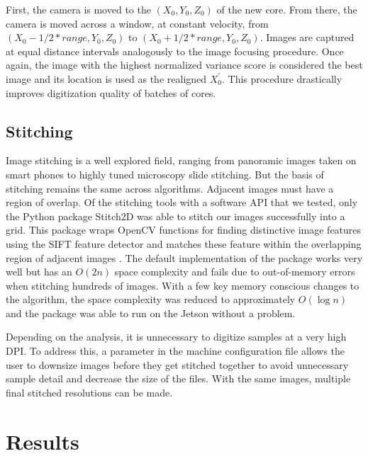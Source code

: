 \documentclass[a4paper,12pt]{article}
\begin{document}
First, the camera is moved to the $(X_0, Y_0, Z_0)$ of the new core. 
From there, the camera is moved across a window, at constant velocity, from $(X_0 - 1/2*{range}, Y_0, Z_0)$ to $(X_0 + 1/2*{range}, Y_0, Z_0)$. 
Images are captured at equal distance intervals analogously to the image focusing procedure. 
Once again, the image with the highest normalized variance score is considered the best image and its location is used as the realigned $X_0^\prime$.
This procedure drastically improves digitization quality of batches of cores.

\subsection{Stitching}

Image stitching is a well explored field, ranging from panoramic images taken on smart phones to highly tuned microscopy slide stitching. 
But the basis of stitching remains the same across algorithms. Adjacent images must have a region of overlap. 
Of the stitching tools with a software API that we tested, only the Python package Stitch2D was able to stitch our images successfully into a grid. %
This package wraps OpenCV functions for finding distinctive image features using the SIFT feature detector and matches these feature within the overlapping region of adjacent images \citep{lowe_distinctive_2004}. 
The default implementation of the package works very well but has an $O(2n)$ space complexity and fails due to out-of-memory errors when stitching hundreds of images. %
With a few key memory conscious changes to the algorithm, the space complexity was reduced to approximately $O(\log{n})$ and the package was able to run on the Jetson without a problem. 

Depending on the analysis, it is unnecessary to digitize samples at a very high DPI. To address this, a parameter in the machine configuration file 
allows the user to downsize images before they get stitched together to avoid unnecessary sample detail and decrease the size of the files.
With the same images, multiple final stitched resolutions can be made. 

\section{Results}
\end{document}
